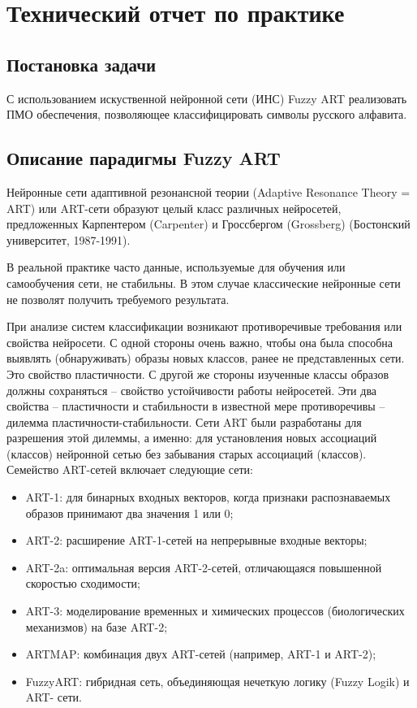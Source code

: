 \newpage
\section{Технический отчет по практике}

\subsection{Постановка задачи}

С использованием искуственной нейронной сети (ИНС) Fuzzy ART реализовать ПМО обеспечения, позволяющее классифицировать символы русского алфавита.

\subsection{Описание парадигмы Fuzzy ART}


Нейронные сети адаптивной резонансной теории (Adaptive Resonance Theory = ART) или ART-сети образуют целый класс различных нейросетей, предложенных Карпентером (Carpenter) и Гроссбергом (Grossberg) (Бостонский университет, 1987-1991).

В реальной практике часто данные, используемые для обучения или самообучения сети, не стабильны. В этом случае классические нейронные сети не позволят получить требуемого результата.

При анализе систем классификации возникают противоречивые требования или свойства нейросети. С одной стороны очень важно, чтобы она была способна выявлять (обнаруживать) образы новых классов, ранее не представленных сети. Это свойство пластичности. С другой же стороны изученные классы образов должны сохраняться – свойство устойчивости работы нейросетей. Эти два свойства – пластичности и стабильности в известной мере противоречивы – дилемма пластичности-стабильности. Сети ART были разработаны для разрешения этой дилеммы, а именно: для установления новых ассоциаций (классов) нейронной сетью без забывания старых ассоциаций (классов). Семейство ART-сетей включает следующие сети:
\begin{itemize} \compact
	\item ART-1: для бинарных входных векторов, когда признаки распознаваемых образов принимают два значения 1 или 0;
	\item ART-2: расширение ART-1-сетей на непрерывные входные векторы;
	\item ART-2a: оптимальная версия ART-2-сетей, отличающаяся повышенной скоростью сходимости;
	\item ART-3: моделирование временных и химических процессов (биологических механизмов) на базе ART-2;
	\item ARTMAP: комбинация двух ART-сетей (например, ART-1 и ART-2);
	\item FuzzyART: гибридная сеть, объединяющая нечеткую логику (Fuzzy Logik) и ART- сети.
\end{itemize}


